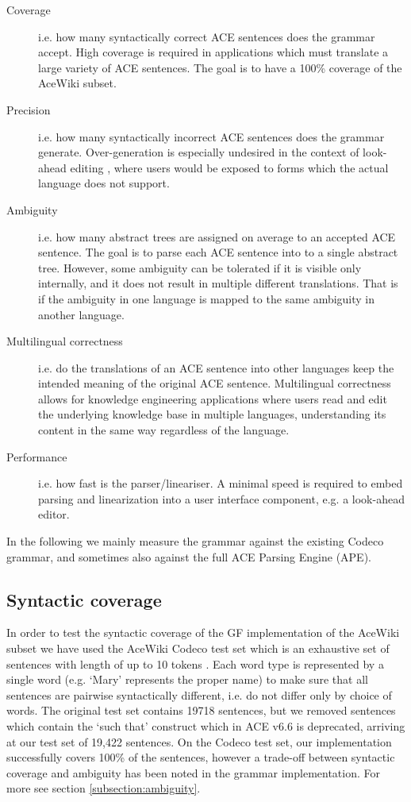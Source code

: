 \documentclass[a4paper]{article}
\begin{document}
\begin{description}
\item[Coverage]
i.e. how many syntactically correct ACE sentences does the grammar accept.
High coverage is required in applications which must translate a large variety
of ACE sentences. The goal is to have a 100\% coverage of the AceWiki subset.

\item[Precision]
i.e. how many syntactically incorrect ACE sentences does the grammar generate.
Over-generation is especially undesired in the context of look-ahead editing
\cite{schwitter:eamt-claw2003}, where users would be exposed to
forms which the actual language does not support.

\item[Ambiguity]
i.e. how many abstract trees are assigned on average to an accepted ACE
sentence. The goal is to parse each ACE sentence into to a single abstract
tree. However, some ambiguity can be tolerated if it is visible only internally,
and it does not result in multiple different translations.
That is if the ambiguity in one language is mapped to the same ambiguity in
another language.

\item[Multilingual correctness]
i.e. do the translations of an ACE sentence into other languages keep the
intended meaning of the original ACE sentence. Multilingual correctness allows
for knowledge engineering applications where users read and edit the underlying
knowledge base in multiple languages, understanding its content in the same
way regardless of the language.

\item[Performance]
i.e. how fast is the parser/lineariser. A minimal speed is required to embed
parsing and linearization into a user interface component, e.g. a look-ahead
editor.
\end{description}

In the following we mainly measure the grammar against the existing
Codeco grammar, and sometimes also against the full ACE Parsing Engine (APE).

\subsection{Syntactic coverage}

In order to test the syntactic coverage of the GF implementation of the
AceWiki subset we have used the AceWiki Codeco test set which
is an exhaustive set of sentences with length of up to 10
tokens \cite{kuhn2010doctoralthesis}. Each word
type is represented by a single word (e.g. `Mary' represents the proper name)
to make sure that all sentences are pairwise syntactically different, i.e.
do not differ only by choice of words.
The original test set contains 19718 sentences, but we removed sentences which
contain the `such that' construct which in ACE v6.6 is deprecated,
arriving at our test set of 19,422 sentences.
On the Codeco test set, our implementation successfully covers 100\% of the
sentences, however
a trade-off between syntactic coverage and ambiguity has been noted in the
grammar implementation. For more see section \ref{subsection:ambiguity}.
\end{document}
